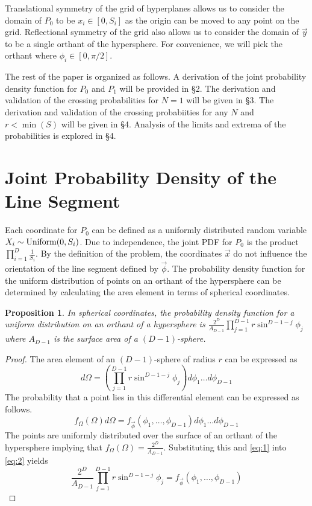 \documentclass{article}
\newtheorem{proposition}{Proposition}
\begin{document}
Translational symmetry of the grid of hyperplanes allows us to consider the domain of $P_0$ to be $x_i\in[0,S_i]$ as the origin can be moved to any point on the grid.
Reflectional symmetry of the grid also allows us to consider the domain of $\vec{y}$ to be a single orthant of the hypersphere. For convenience, we will pick the orthant where
$\phi_i \in [0, \pi/2]$.

The rest of the paper is organized as follows. A derivation of the joint probability density function for $P_0$ and $P_1$ will be provided in \S 2. The derivation and validation
of the crossing probabilities for $N=1$ will be given in \S 3. The derivation and validation of the crossing probabiities for any $N$ and $r<\min(S)$ will be given in \S 4. Analysis of the limits
and extrema of the probabilities is explored in \S 4.

\section{Joint Probability Density of the Line Segment}
Each coordinate for $P_0$ can be defined as a uniformly distributed random variable $X_i\sim{\rm Uniform}(0,S_i)$. Due to independence, the joint PDF for $P_0$ is the product
$\prod_{i=1}^D \frac{1}{S_i}$. By the definition of the problem, the coordinates $\vec{x}$ do not influence the orientation of the line segment defined by $\vec{\phi}$. 
The probability density function for the uniform distribution of points on an orthant of the hypersphere can be determined by calculating the area element in terms of spherical coordinates.

\begin{proposition}
In spherical coordinates, the probability density function for a uniform distribution on an orthant of a hypersphere is $\frac{2^D}{A_{D-1}}\prod_{j=1}^{D-1}r\sin^{D-1-j}\phi_j$ where
$A_{D-1}$ is the surface area of a $(D-1)$-sphere.
\end{proposition}
\begin{proof}
	The area element of an $(D-1)$-sphere of radius $r$ can be expressed as 
	\begin{equation} \label{eq:1}
	d\Omega = \left(\prod_{j=1}^{D-1}r\sin^{D-1-j}\phi_j\right)d\phi_1 \hdots d\phi_{D-1}
	\end{equation}
	The probability that a point lies in this differential element can be expressed as follows.
	\begin{equation} \label{eq:2}
	f_{\Omega}(\Omega)d\Omega = f_{\vec{\phi}}(\phi_1, \hdots, \phi_{D-1})d\phi_1 \hdots d\phi_{D-1}
	\end{equation}
	The points are uniformly distributed over the surface of an orthant of the hypersphere implying that $f_{\Omega}(\Omega) = \frac{2^D}{A_{D-1}}$. Substituting this and
	\ref{eq:1} into \ref{eq:2} yields
	\begin{equation}
	\frac{2^D}{A_{D-1}}\prod_{j=1}^{D-1}r\sin^{D-1-j}\phi_j = f_{\vec{\phi}}(\phi_1, \hdots, \phi_{D-1})
	\end{equation}
\end{proof}
\end{document}
